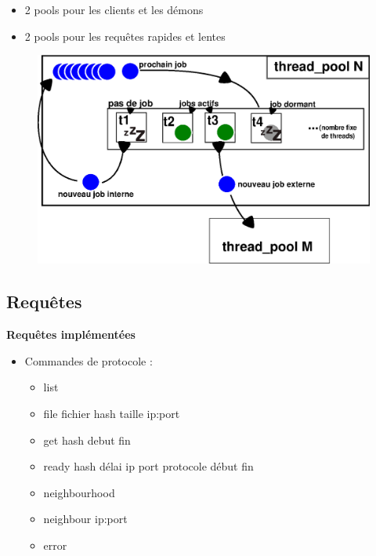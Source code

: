 \documentclass{beamer}
\begin{document}
\begin{frame}
    \begin{itemize}
        \item 2 pools pour les clients et les démons
        \item 2 pools pour les requêtes rapides et lentes
    \end{itemize}
\begin{center}
\begin{figure}[htbp]
    \centering
    \includegraphics[scale=0.6]{thread_pool.eps}
\end{figure}
\end{center}

\end{frame}

\begin{frame}
    \section{Requêtes}

    \textbf{Requêtes implémentées}
    \begin{itemize}
        \item Commandes de protocole :
            \begin{itemize}
                \item list
                \item file fichier hash taille ip:port
                \item get hash debut fin
                \item ready hash délai ip port protocole début fin
                \item neighbourhood
                \item neighbour ip:port
                \item error
            \end{itemize}
    \end{itemize}

\end{frame}
\end{document}
